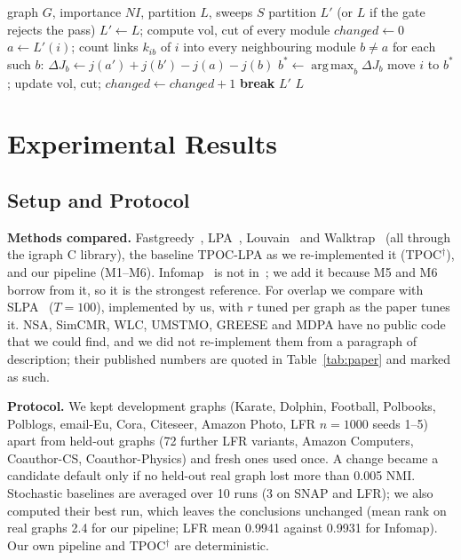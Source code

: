 \documentclass[conference]{IEEEtran}
\DeclareMathOperator*{\argmax}{arg\,max}
\begin{document}
\begin{algorithm}[t]
\footnotesize
\caption{\textsc{SynwalkMoves}$(G,NI,L,S)$ (M6)}\label{alg:moves}
\begin{algorithmic}[1]
\Require graph $G$, importance $NI$, partition $L$, sweeps $S$
\Ensure partition $L'$ (or $L$ if the gate rejects the pass)
\State $L'\gets L$; compute $\mathrm{vol}$, $\mathrm{cut}$ of every module
  \State $changed\gets0$
    \State $a\gets L'(i)$; count links $k_{ib}$ of $i$ into every neighbouring module $b\ne a$
    \State for each such $b$: $\Delta J_b\gets j(a')+j(b')-j(a)-j(b)$ 
    \State $b^{*}\gets\argmax_b\Delta J_b$
     move $i$ to $b^{*}$; update $\mathrm{vol}$, $\mathrm{cut}$; $changed\gets changed+1$ \EndIf
  \EndFor
   \textbf{break} \EndIf
\EndFor
{} \Return $L'$ \Else \; \Return $L$ \EndIf {}
\end{algorithmic}
\end{algorithm}

\section{Experimental Results}\label{sec:results}
\subsection{Setup and Protocol}\label{sec:setup}
\textbf{Methods compared.} Fastgreedy~\cite{clauset2004}, LPA~\cite{raghavan2007}, Louvain~\cite{blondel2008} and Walktrap~\cite{pons2006} (all through the igraph C library), the baseline TPOC-LPA as we re-implemented it (TPOC$^{\dagger}$), and our pipeline (M1--M6). Infomap~\cite{rosvall2008} is not in~\cite{kong2026}; we add it because M5 and M6 borrow from it, so it is the strongest reference. For overlap we compare with SLPA~\cite{xie2011} ($T{=}100$), implemented by us, with $r$ tuned per graph as the paper tunes it. NSA, SimCMR, WLC, UMSTMO, GREESE and MDPA have no public code that we could find, and we did not re-implement them from a paragraph of description; their published numbers are quoted in Table~\ref{tab:paper} and marked as such.

\textbf{Protocol.} We kept development graphs (Karate, Dolphin, Football, Polbooks, Polblogs, email-Eu, Cora, Citeseer, Amazon Photo, LFR $n{=}1000$ seeds 1--5) apart from held-out graphs (72 further LFR variants, Amazon Computers, Coauthor-CS, Coauthor-Physics) and fresh ones used once. A change became a candidate default only if no held-out real graph lost more than 0.005 NMI. Stochastic baselines are averaged over 10 runs (3 on SNAP and LFR); we also computed their best run, which leaves the conclusions unchanged (mean rank on real graphs 2.4 for our pipeline; LFR mean 0.9941 against 0.9931 for Infomap). Our own pipeline and TPOC$^{\dagger}$ are deterministic.
\end{document}
